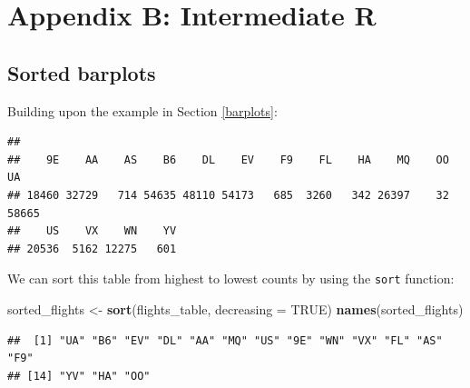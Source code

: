 \documentclass[]{tufte-book}
\newenvironment{Shaded}{\begin{snugshade}}{\end{snugshade}}
\newcommand{\KeywordTok}[1]{\textcolor[rgb]{0.13,0.29,0.53}{\textbf{{#1}}}}
\newcommand{\DataTypeTok}[1]{\textcolor[rgb]{0.13,0.29,0.53}{{#1}}}
\newcommand{\StringTok}[1]{\textcolor[rgb]{0.31,0.60,0.02}{{#1}}}
\newcommand{\CommentTok}[1]{\textcolor[rgb]{0.56,0.35,0.01}{\textit{{#1}}}}
\newcommand{\OtherTok}[1]{\textcolor[rgb]{0.56,0.35,0.01}{{#1}}}
\newcommand{\NormalTok}[1]{{#1}}
\begin{document}
\chapter{Appendix B: Intermediate R}\label{appendix2}

\section{Sorted barplots}\label{sorted-barplots}

Building upon the example in Section \ref{barplots}:

\begin{Shaded}
\end{Shaded}

\begin{verbatim}
## 
##    9E    AA    AS    B6    DL    EV    F9    FL    HA    MQ    OO    UA 
## 18460 32729   714 54635 48110 54173   685  3260   342 26397    32 58665 
##    US    VX    WN    YV 
## 20536  5162 12275   601
\end{verbatim}

\begin{Shaded}
\end{Shaded}

We can sort this table from highest to lowest counts by using the
\texttt{sort} function:

\begin{Shaded}
\begin{Highlighting}[]
\NormalTok{sorted_flights <-}\StringTok{ }\KeywordTok{sort}\NormalTok{(flights_table, }\DataTypeTok{decreasing =} \OtherTok{TRUE}\NormalTok{)}
\KeywordTok{names}\NormalTok{(sorted_flights)}
\end{Highlighting}
\end{Shaded}

\begin{verbatim}
##  [1] "UA" "B6" "EV" "DL" "AA" "MQ" "US" "9E" "WN" "VX" "FL" "AS" "F9"
## [14] "YV" "HA" "OO"
\end{verbatim}
\end{document}
